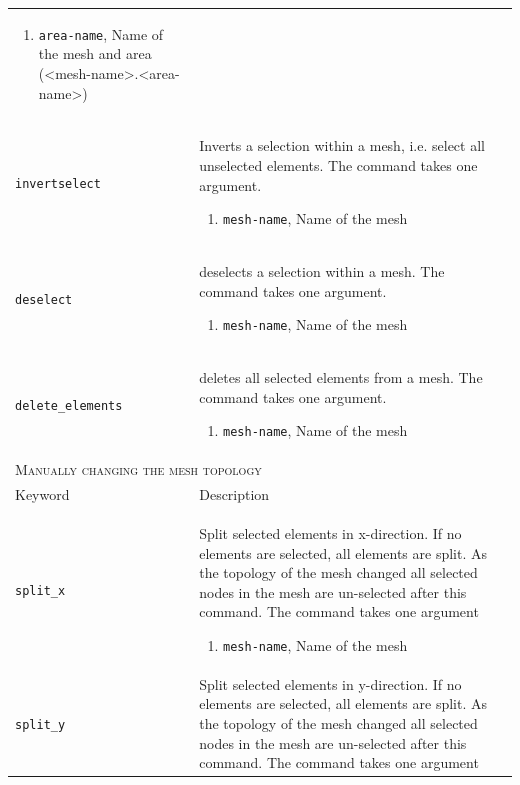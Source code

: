 \documentclass[noshowpacs,preprintnumbers,amsmath,amssymb, letter]{revtex4}
\begin{document}
\begin{longtable}{p{}p{}}
\begin{enumerate}
\item \texttt{area-name}, Name of the mesh and area (\textless mesh-name\textgreater .\textless area-name\textgreater )
\end{enumerate}\\
\texttt{invertselect}	& Inverts a selection within a mesh, i.e. select all unselected elements. The command takes one argument.
\begin{enumerate}
\item \texttt{mesh-name}, Name of the mesh
\end{enumerate}\\
\texttt{deselect}	& deselects a selection within a mesh. The command takes one argument.
\begin{enumerate}
\item \texttt{mesh-name}, Name of the mesh
\end{enumerate}\\
\texttt{delete\_elements}	& deletes all selected elements from a mesh. The command takes one argument.
\begin{enumerate}
\item \texttt{mesh-name}, Name of the mesh
\end{enumerate}\\
\multicolumn{2}{l}{\textsc{Manually changing the mesh topology}} \\*
\hline
Keyword & Description \\
\texttt{split\_x}	& Split selected elements in x-direction. If no elements are selected, all elements are split. As the topology of the mesh changed all selected nodes in the mesh are un-selected after this command. The command takes one argument 
\begin{enumerate}
\item \texttt{mesh-name}, Name of the mesh
\end{enumerate}\\
\texttt{split\_y}	& Split selected elements in y-direction. If no elements are selected, all elements are split. As the topology of the mesh changed all selected nodes in the mesh are un-selected after this command. The command takes one argument 

\end{longtable}
\end{document}
